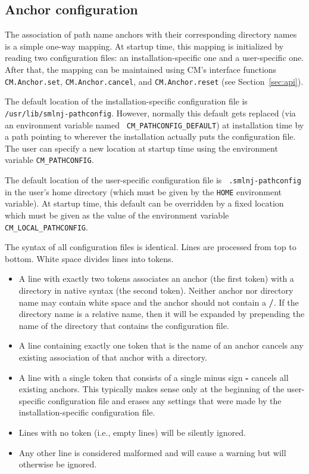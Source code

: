 \documentclass{article}
\begin{document}
\subsection{Anchor configuration}
\label{sec:anchors}

The association of path name anchors with their corresponding
directory names is a simple one-way mapping.  At startup time, this
mapping is initialized by reading two configuration files: an
installation-specific one and a user-specific one.  After that, the
mapping can be maintained using CM's interface functions {\tt
CM.Anchor.set}, {\tt CM.Anchor.cancel}, and {\tt CM.Anchor.reset}
(see Section~\ref{sec:api}).

The default location of the installation-specific configuration file
is {\tt /usr/lib/smlnj-pathconfig}.  However, normally this default
gets replaced (via an environment variable named {\tt
CM\_PATHCONFIG\_DEFAULT}) at installation time by a path pointing to
wherever the installation actually puts the configuration file.
The user can specify a new location at startup time using the
environment variable {\tt CM\_PATHCONFIG}.

The default location of the user-specific configuration file is {\tt
.smlnj-pathconfig} in the user's home directory (which must be given
by the {\tt HOME} environment variable).  At startup time, this
default can be overridden by a fixed location which must be given as
the value of the environment variable {\tt CM\_LOCAL\_PATHCONFIG}.

The syntax of all configuration files is identical.  Lines are
processed from top to bottom. White space divides lines into tokens.
\begin{itemize}
\item A line with exactly two tokens associates an anchor (the first
token) with a directory in native syntax (the second token).  Neither
anchor nor directory name may contain white space and the anchor
should not contain a {\bf /}.  If the directory name is a relative
name, then it will be expanded by prepending the name of the directory
that contains the configuration file.
\item A line containing exactly one token that is the name of an
anchor cancels any existing association of that anchor with a
directory.
\item A line with a single token that consists of a single minus sign
{\bf -} cancels all existing anchors.  This typically makes sense only
at the beginning of the user-specific configuration file and
erases any settings that were made by the installation-specific
configuration file.
\item Lines with no token (i.e., empty lines) will be silently ignored.
\item Any other line is considered malformed and will cause a warning
but will otherwise be ignored.
\end{itemize}
\end{document}
